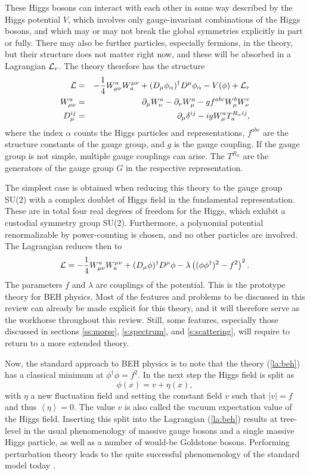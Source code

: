 \documentclass[final,12pt,3p,longtitle]{elsarticle}
\newcommand*{\La}{{\cal{L}}}
\newcommand*{\no}{\noindent}
\newcommand*{\bea}{\begin{eqnarray}}
\newcommand*{\eea}{\end{eqnarray}}
\newcommand*{\be}{\begin{equation}}
\newcommand*{\ee}{\end{equation}}
\newcommand*{\pd}{\partial}
\newcommand*{\pdm}{\pd_{\mu}}
\newcommand*{\pdn}{\pd_{\nu}}
\newcommand*{\pref}[1]{(\ref{#1})}
\newcommand*{\mn}{{\mu\nu}}
\newcommand*{\nn}{\nonumber}
\newcommand*{\1}{1\!\!\!\bot}
\newcommand*{\la}{\left\langle}
\newcommand*{\ra}{\right\rangle}
\begin{document}
These Higgs bosons can interact with each other in some way described by the Higgs potential $V$, which involves only gauge-invariant combinations of the Higgs bosons, and which may or may not break the global symmetries explicitly in part or fully. There may also be further particles, especially fermions, in the theory, but their structure does not matter right now, and these will be absorbed in a Lagrangian ${\La}_r$. The theory therefore has the structure
\bea
{\La}&=&-\frac{1}{4}W_\mn^aW^\mn_a+(D_\mu\phi_\alpha)^\dagger D^\mu\phi_\alpha-V(\phi)+{\La}_r\label{la:gen}\\
W_\mn^a&=&\pdm W_\nu^a-\pdn W_\mu^a-g f^{abc} W_\mu^b W_\nu^c\nn\\
D_\mu^{ij}&=&\pd_\mu\delta^{ij}-igW_\mu^aT^{R_\alpha ij}_a\label{covderiv},
\eea
\no where the index $\alpha$ counts the Higgs particles and representations, $f^{abc}$ are the structure constants of the gauge group, and $g$ is the gauge coupling. If the gauge group is not simple, multiple gauge couplings can arise. The $T^{R_\alpha}$ are the generators of the gauge group $G$ in the respective representation.

The simplest case is obtained when reducing this theory to the gauge group SU(2) with a complex doublet of Higgs field in the fundamental representation. These are in total four real degrees of freedom for the Higgs, which exhibit a custodial symmetry group SU(2). Furthermore, a polynomial potential renormalizable by power-counting is chosen, and no other particles are involved. The Lagrangian reduces then to
\be
\La=-\frac{1}{4}W_\mn^aW^\mn_a+(D_\mu\phi)^\dagger D^\mu\phi-\lambda\left((\phi\phi^\dagger)^2-f^2\right)^2\label{la:beh}.
\ee
\no The parameters $f$ and $\lambda$ are couplings of the potential. This is the prototype theory for BEH physics. Most of the features and problems to be discussed in this review can already be made explicit for this theory, and it will therefore serve as the workhorse throughout this review. Still, some features, especially those discussed in sections \ref{ss:morse}, \ref{s:spectrum}, and \ref{s:scattering}, will require to return to a more extended theory.

Now, the standard approach to BEH physics \cite{Bohm:2001yx} is to note that the theory \pref{la:beh} has a classical minimum at $\phi^\dagger\phi=f^2$. In the next step the Higgs field is split as 
\be
\phi(x)=v+\eta(x)\label{split},
\ee
\no with $\eta$ a new fluctuation field and setting the constant field $v$ such that $|v|=f$ and thus $\la\eta\ra=0$. The value $v$ is also called the vacuum expectation value of the Higgs field. Inserting this split into the Lagrangian \pref{la:beh} results at tree-level in the usual phenomenology of massive gauge bosons and a single massive Higgs particle, as well as a number of would-be Goldstone bosons. Performing perturbation theory leads to the quite successful phenomenology of the standard model today \cite{pdg}.
\end{document}
